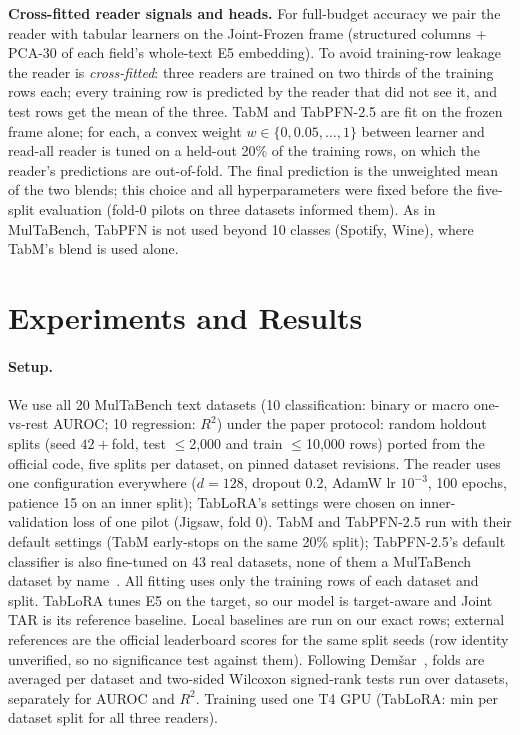 \documentclass{article}
\begin{document}
\textbf{Cross-fitted reader signals and heads.}
For full-budget accuracy we pair the reader with tabular learners on the Joint-Frozen frame (structured columns + PCA-30 of each field's whole-text E5 embedding).
To avoid training-row leakage the reader is \emph{cross-fitted}: three readers are trained on two thirds of the training rows each; every training row is predicted by the reader that did not see it, and test rows get the mean of the three.
TabM and TabPFN-2.5 are fit on the frozen frame alone; for each, a convex weight $w\in\{0,0.05,\dots,1\}$ between learner and read-all reader is tuned on a held-out 20\% of the training rows, on which the reader's predictions are out-of-fold.
The final prediction is the unweighted mean of the two blends; this choice and all hyperparameters were fixed before the five-split evaluation (fold-0 pilots on three datasets informed them).
As in MulTaBench, TabPFN is not used beyond 10 classes (Spotify, Wine), where TabM's blend is used alone.

\section{Experiments and Results}

\paragraph{Setup.}
We use all 20 MulTaBench text datasets (10 classification: binary or macro one-vs-rest AUROC; 10 regression: $R^2$) under the paper protocol: random holdout splits (seed $42+$fold, test $\le$2{,}000 and train $\le$10{,}000 rows) ported from the official code, five splits per dataset, on pinned dataset revisions.
The reader uses one configuration everywhere ($d=128$, dropout 0.2, AdamW lr $10^{-3}$, 100 epochs, patience 15 on an inner split); TabLoRA's settings were chosen on inner-validation loss of one pilot (Jigsaw, fold 0).
TabM and TabPFN-2.5 run with their default settings (TabM early-stops on the same 20\% split); TabPFN-2.5's default classifier is also fine-tuned on 43 real datasets, none of them a MulTaBench dataset by name~\cite{grinsztajn2025tabpfn25}.
All fitting uses only the training rows of each dataset and split.
TabLoRA tunes E5 on the target, so our model is target-aware and Joint TAR is its reference baseline.
Local baselines are run on our exact rows; external references are the official leaderboard scores for the same split seeds (row identity unverified, so no significance test against them).
Following Dem\v{s}ar~\cite{demsar2006statistical}, folds are averaged per dataset and two-sided Wilcoxon signed-rank tests run over datasets, separately for AUROC and $R^2$.
Training used one T4 GPU (TabLoRA: \loraMinutes{} min per dataset split for all three readers).
\end{document}
